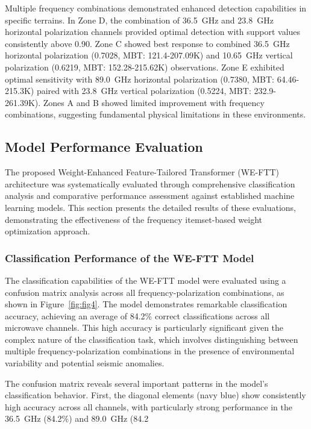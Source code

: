 \documentclass[preprint,review,12pt,authoryear]{elsarticle}
\begin{document}
Multiple frequency combinations demonstrated enhanced detection capabilities in specific terrains. In Zone D, the combination of 36.5~GHz and 23.8~GHz horizontal polarization channels provided optimal detection with support values consistently above 0.90. Zone C showed best response to combined 36.5~GHz horizontal polarization (0.7028, MBT: 121.4-207.09K) and 10.65~GHz vertical polarization (0.6219, MBT: 152.28-215.62K) observations. Zone E exhibited optimal sensitivity with 89.0~GHz horizontal polarization (0.7380, MBT: 64.46-215.3K) paired with 23.8~GHz vertical polarization (0.5224, MBT: 232.9-261.39K). Zones A and B showed limited improvement with frequency combinations, suggesting fundamental physical limitations in these environments.

\subsection{Model Performance Evaluation}
The proposed Weight-Enhanced Feature-Tailored Transformer (WE-FTT) architecture was systematically evaluated through comprehensive classification analysis and comparative performance assessment against established machine learning models. This section presents the detailed results of these evaluations, demonstrating the effectiveness of the frequency itemset-based weight optimization approach.

\subsubsection{Classification Performance of the WE-FTT Model}
The classification capabilities of the WE-FTT model were evaluated using a confusion matrix analysis across all frequency-polarization combinations, as shown in Figure~\ref{fig:fig4}. The model demonstrates remarkable classification accuracy, achieving an average of 84.2\% correct classifications across all microwave channels. This high accuracy is particularly significant given the complex nature of the classification task, which involves distinguishing between multiple frequency-polarization combinations in the presence of environmental variability and potential seismic anomalies.

The confusion matrix reveals several important patterns in the model's classification behavior. First, the diagonal elements (navy blue) show consistently high accuracy across all channels, with particularly strong performance in the 36.5~GHz (84.2\%) and 89.0~GHz (84.2%
\end{document}
